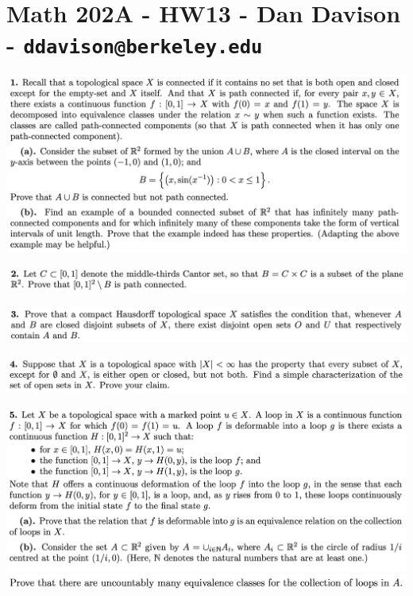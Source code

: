 \section*{Math 202A - HW13 - Dan Davison - \texttt{ddavison@berkeley.edu}}

\begin{mdframed}
\includegraphics[width=400pt]{img/analysis--berkeley-202a-hw13-26dd.png}
\end{mdframed}

\newpage
\begin{mdframed}
\includegraphics[width=400pt]{img/analysis--berkeley-202a-hw13-e2f7.png}
\end{mdframed}

\newpage
\begin{mdframed}
\includegraphics[width=400pt]{img/analysis--berkeley-202a-hw13-983a.png}
\end{mdframed}

\newpage
\begin{mdframed}
\includegraphics[width=400pt]{img/analysis--berkeley-202a-hw13-9356.png}
\end{mdframed}

\newpage
\begin{mdframed}
\includegraphics[width=400pt]{img/analysis--berkeley-202a-hw13-aa83.png}\\
\includegraphics[width=400pt]{img/analysis--berkeley-202a-hw13-f49f.png}
\end{mdframed}
